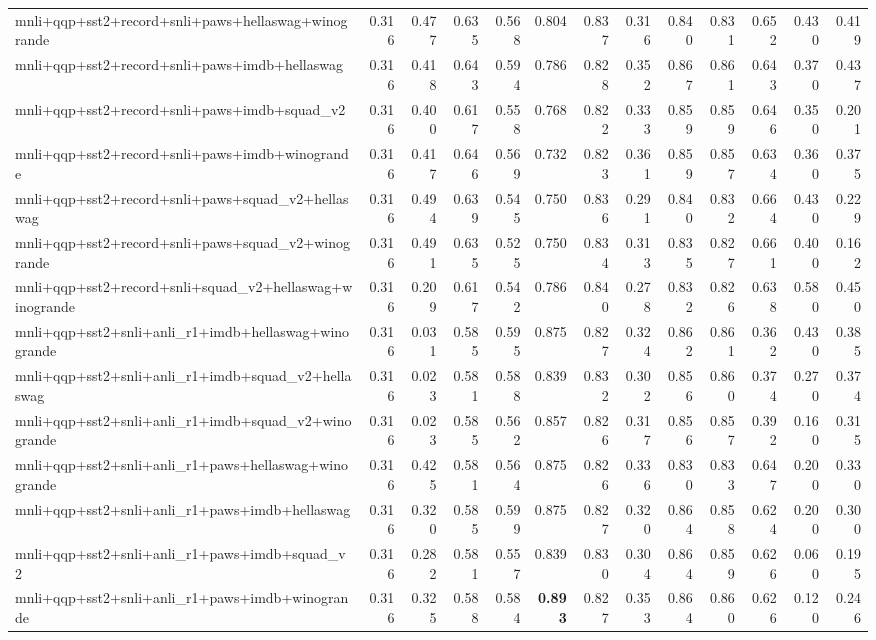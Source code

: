 \begin{table}[t]
\begin{tabular}{lrrrrrrrrrrrr}
    mnli+qqp+sst2+record+snli+paws+hellaswag+winogrande & 0.316 & 0.477 & 0.635 & 0.568 & 0.804 & 0.837 & 0.316 & 0.840 & 0.831 & 0.652 & 0.430 & 0.419 \\
    mnli+qqp+sst2+record+snli+paws+imdb+hellaswag & 0.316 & 0.418 & 0.643 & 0.594 & 0.786 & 0.828 & 0.352 & 0.867 & 0.861 & 0.643 & 0.370 & 0.437 \\
    mnli+qqp+sst2+record+snli+paws+imdb+squad\_v2 & 0.316 & 0.400 & 0.617 & 0.558 & 0.768 & 0.822 & 0.333 & 0.859 & 0.859 & 0.646 & 0.350 & 0.201 \\
    mnli+qqp+sst2+record+snli+paws+imdb+winogrande & 0.316 & 0.417 & 0.646 & 0.569 & 0.732 & 0.823 & 0.361 & 0.859 & 0.857 & 0.634 & 0.360 & 0.375 \\
    mnli+qqp+sst2+record+snli+paws+squad\_v2+hellaswag & 0.316 & 0.494 & 0.639 & 0.545 & 0.750 & 0.836 & 0.291 & 0.840 & 0.832 & 0.664 & 0.430 & 0.229 \\
    mnli+qqp+sst2+record+snli+paws+squad\_v2+winogrande & 0.316 & 0.491 & 0.635 & 0.525 & 0.750 & 0.834 & 0.313 & 0.835 & 0.827 & 0.661 & 0.400 & 0.162 \\
    mnli+qqp+sst2+record+snli+squad\_v2+hellaswag+winogrande & 0.316 & 0.209 & 0.617 & 0.542 & 0.786 & 0.840 & 0.278 & 0.832 & 0.826 & 0.638 & 0.580 & 0.450 \\
    mnli+qqp+sst2+snli+anli\_r1+imdb+hellaswag+winogrande & 0.316 & 0.031 & 0.585 & 0.595 & 0.875 & 0.827 & 0.324 & 0.862 & 0.861 & 0.362 & 0.430 & 0.385 \\
    mnli+qqp+sst2+snli+anli\_r1+imdb+squad\_v2+hellaswag & 0.316 & 0.023 & 0.581 & 0.588 & 0.839 & 0.832 & 0.302 & 0.856 & 0.860 & 0.374 & 0.270 & 0.374 \\
    mnli+qqp+sst2+snli+anli\_r1+imdb+squad\_v2+winogrande & 0.316 & 0.023 & 0.585 & 0.562 & 0.857 & 0.826 & 0.317 & 0.856 & 0.857 & 0.392 & 0.160 & 0.315 \\
    mnli+qqp+sst2+snli+anli\_r1+paws+hellaswag+winogrande & 0.316 & 0.425 & 0.581 & 0.564 & 0.875 & 0.826 & 0.336 & 0.830 & 0.833 & 0.647 & 0.200 & 0.330 \\
    mnli+qqp+sst2+snli+anli\_r1+paws+imdb+hellaswag & 0.316 & 0.320 & 0.585 & 0.599 & 0.875 & 0.827 & 0.320 & 0.864 & 0.858 & 0.624 & 0.200 & 0.300 \\
    mnli+qqp+sst2+snli+anli\_r1+paws+imdb+squad\_v2 & 0.316 & 0.282 & 0.581 & 0.557 & 0.839 & 0.830 & 0.304 & 0.864 & 0.859 & 0.626 & 0.060 & 0.195 \\
    mnli+qqp+sst2+snli+anli\_r1+paws+imdb+winogrande & 0.316 & 0.325 & 0.588 & 0.584 & \textbf{0.893} & 0.827 & 0.353 & 0.864 & 0.860 & 0.626 & 0.120 & 0.246 \\

\end{tabular}
\end{table}
